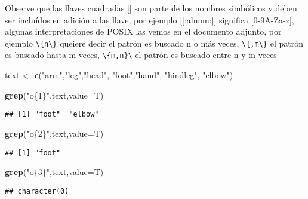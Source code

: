 \documentclass[]{article}
\newenvironment{Shaded}{\begin{snugshade}}{\end{snugshade}}
\newcommand{\KeywordTok}[1]{\textcolor[rgb]{0.13,0.29,0.53}{\textbf{#1}}}
\newcommand{\DataTypeTok}[1]{\textcolor[rgb]{0.13,0.29,0.53}{#1}}
\newcommand{\StringTok}[1]{\textcolor[rgb]{0.31,0.60,0.02}{#1}}
\newcommand{\NormalTok}[1]{#1}
\begin{document}
Observe que las llaves cuadradas {[}{]} son parte de los nombres
simbólicos y deben ser incluídos en adición a las llave, por ejemplo
{[}{[}:alnum:{]}{]} significa {[}0-9A-Za-z{]}, algunas interpretaciones
de POSIX las vemos en el documento adjunto, por ejemplo
\texttt{\textbackslash{}\{n\textbackslash{}\}} queiere decir el patrón
es buscado n o más veces,
\texttt{\textbackslash{}\{,m\textbackslash{}\}} el patrón es buscado
hasta m veces, \texttt{\textbackslash{}\{m,n\}\textbackslash{}} el
patrón es buscado entre n y m veces

\begin{Shaded}
\begin{Highlighting}[]
\NormalTok{text <-}\StringTok{ }\KeywordTok{c}\NormalTok{(}\StringTok{"arm"}\NormalTok{,}\StringTok{"leg"}\NormalTok{,}\StringTok{"head"}\NormalTok{, }\StringTok{"foot"}\NormalTok{,}\StringTok{"hand"}\NormalTok{, }\StringTok{"hindleg"}\NormalTok{, }\StringTok{"elbow"}\NormalTok{)}
\end{Highlighting}
\end{Shaded}

\begin{Shaded}
\begin{Highlighting}[]
\KeywordTok{grep}\NormalTok{(}\StringTok{"o\{1\}"}\NormalTok{,text,}\DataTypeTok{value=}\NormalTok{T)}
\end{Highlighting}
\end{Shaded}

\begin{verbatim}
## [1] "foot"  "elbow"
\end{verbatim}

\begin{Shaded}
\begin{Highlighting}[]
\KeywordTok{grep}\NormalTok{(}\StringTok{"o\{2\}"}\NormalTok{,text,}\DataTypeTok{value=}\NormalTok{T)}
\end{Highlighting}
\end{Shaded}

\begin{verbatim}
## [1] "foot"
\end{verbatim}

\begin{Shaded}
\begin{Highlighting}[]
\KeywordTok{grep}\NormalTok{(}\StringTok{"o\{3\}"}\NormalTok{,text,}\DataTypeTok{value=}\NormalTok{T)}
\end{Highlighting}
\end{Shaded}

\begin{verbatim}
## character(0)
\end{verbatim}
\end{document}
